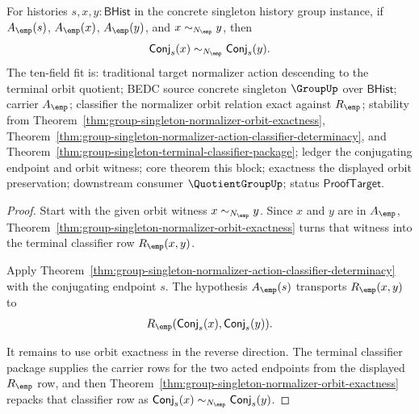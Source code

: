 \begin{theorem}
\label{thm:group-singleton-normalizer-orbit-action-invariance}
For histories $s,x,y:\mathsf{BHist}$ in the concrete singleton history group
instance, if $A_{\emp}(s)$, $A_{\emp}(x)$, $A_{\emp}(y)$, and
$x\sim_{N_{\emp}}y$, then
$$
\mathsf{Conj}_s(x)\sim_{N_{\emp}}\mathsf{Conj}_s(y).
$$
The ten-field fit is: traditional target normalizer action descending to the
terminal orbit quotient; BEDC source concrete singleton $\GroupUp$ over
$\mathsf{BHist}$; carrier $A_{\emp}$; classifier the normalizer orbit relation
exact against $R_{\emp}$; stability from
Theorem~\ref{thm:group-singleton-normalizer-orbit-exactness},
Theorem~\ref{thm:group-singleton-normalizer-action-classifier-determinacy}, and
Theorem~\ref{thm:group-singleton-terminal-classifier-package}; ledger the
conjugating endpoint and orbit witness; core theorem this block; exactness the
displayed orbit preservation; downstream consumer $\QuotientGroupUp$; status
$\mathsf{ProofTarget}$.
\end{theorem}
\begin{proof}
Start with the given orbit witness $x\sim_{N_{\emp}}y$. Since $x$ and $y$ are
in $A_{\emp}$, Theorem~\ref{thm:group-singleton-normalizer-orbit-exactness}
turns that witness into the terminal classifier row $R_{\emp}(x,y)$.

Apply
Theorem~\ref{thm:group-singleton-normalizer-action-classifier-determinacy} with
the conjugating endpoint $s$. The hypothesis $A_{\emp}(s)$ transports
$R_{\emp}(x,y)$ to
$$
R_{\emp}(\mathsf{Conj}_s(x),\mathsf{Conj}_s(y)).
$$

It remains to use orbit exactness in the reverse direction. The terminal
classifier package supplies the carrier rows for the two acted endpoints from
the displayed $R_{\emp}$ row, and then
Theorem~\ref{thm:group-singleton-normalizer-orbit-exactness} repacks that
classifier row as
$\mathsf{Conj}_s(x)\sim_{N_{\emp}}\mathsf{Conj}_s(y)$.
\end{proof}

